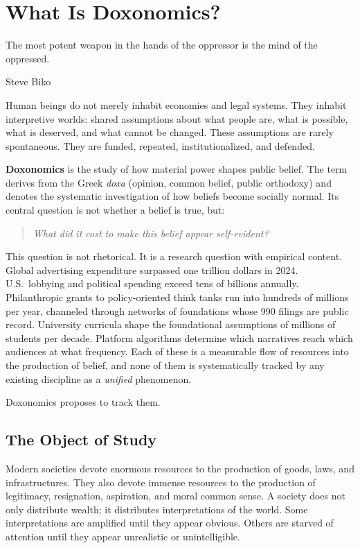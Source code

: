 \chapter{What Is Doxonomics?}
\label{ch:what-is-doxonomics}

\epigraph{The most potent weapon in the hands of the oppressor is the mind of the oppressed.}{Steve Biko}

\noindent
Human beings do not merely inhabit economies and legal systems.
They inhabit interpretive worlds: shared assumptions about what people are, what is possible, what is deserved, and what cannot be changed.
These assumptions are rarely spontaneous.
They are funded, repeated, institutionalized, and defended.

\textbf{Doxonomics} is the study of how material power shapes public belief.
The term derives from the Greek \textit{doxa} (opinion, common belief, public orthodoxy) and denotes the systematic investigation of how beliefs become socially normal.
Its central question is not whether a belief is true, but:

\begin{quote}
\textit{What did it cost to make this belief appear self-evident?}
\end{quote}

This question is not rhetorical.
It is a research question with empirical content.
Global advertising expenditure surpassed one trillion dollars in 2024.
U.S.\ lobbying and political spending exceed tens of billions annually.
Philanthropic grants to policy-oriented think tanks run into hundreds of millions per year, channeled through networks of foundations whose 990 filings are public record.
University curricula shape the foundational assumptions of millions of students per decade.
Platform algorithms determine which narratives reach which audiences at what frequency.
Each of these is a measurable flow of resources into the production of belief, and none of them is systematically tracked by any existing discipline as a \emph{unified} phenomenon.

Doxonomics proposes to track them.


\section{The Object of Study}
\label{sec:ch1-object}

Modern societies devote enormous resources to the production of goods, laws, and infrastructures.
They also devote immense resources to the production of legitimacy, resignation, aspiration, and moral common sense.
A society does not only distribute wealth; it distributes interpretations of the world.
Some interpretations are amplified until they appear obvious.
Others are starved of attention until they appear unrealistic or unintelligible.

